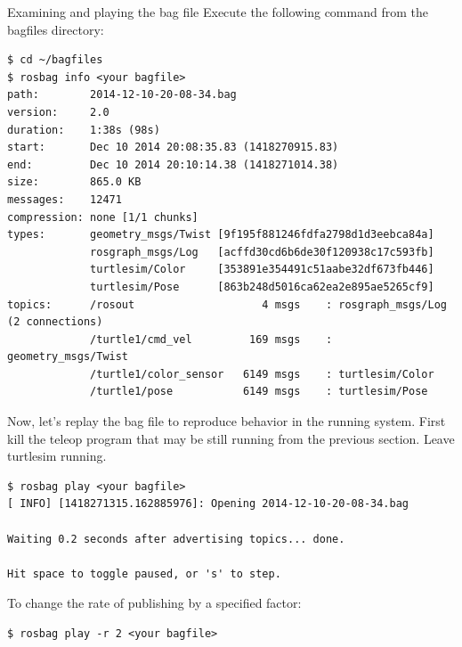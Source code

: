 \begin{frame}{Examining and playing the bag file}
Execute the following command from the bagfiles directory:
\begin{lstlisting}[language=shell]
$ cd ~/bagfiles
$ rosbag info <your bagfile>
path:        2014-12-10-20-08-34.bag
version:     2.0
duration:    1:38s (98s)
start:       Dec 10 2014 20:08:35.83 (1418270915.83)
end:         Dec 10 2014 20:10:14.38 (1418271014.38)
size:        865.0 KB
messages:    12471
compression: none [1/1 chunks]
types:       geometry_msgs/Twist [9f195f881246fdfa2798d1d3eebca84a]
             rosgraph_msgs/Log   [acffd30cd6b6de30f120938c17c593fb]
             turtlesim/Color     [353891e354491c51aabe32df673fb446]
             turtlesim/Pose      [863b248d5016ca62ea2e895ae5265cf9]
topics:      /rosout                    4 msgs    : rosgraph_msgs/Log   (2 connections)
             /turtle1/cmd_vel         169 msgs    : geometry_msgs/Twist
             /turtle1/color_sensor   6149 msgs    : turtlesim/Color    
             /turtle1/pose           6149 msgs    : turtlesim/Pose
\end{lstlisting}

\framebreak
Now, let's replay the bag file to reproduce behavior in the running system. First kill the teleop program that may be still running from the previous section. Leave turtlesim running. 
\begin{lstlisting}[language=shell]
$ rosbag play <your bagfile>
[ INFO] [1418271315.162885976]: Opening 2014-12-10-20-08-34.bag

Waiting 0.2 seconds after advertising topics... done.

Hit space to toggle paused, or 's' to step.
\end{lstlisting}

To change the rate of publishing by a specified factor:
\begin{lstlisting}[language=shell]
$ rosbag play -r 2 <your bagfile>
\end{lstlisting}
\end{frame}

